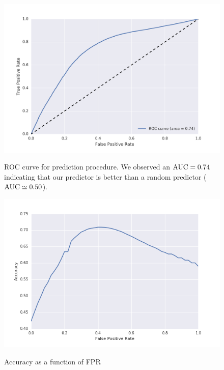 

\begin{figure}[p]
\begin{center}
{\includegraphics[width=0.9\columnwidth,trim={0.5cm 0.5cm 1cm 1cm},clip=true]{figures/ROC_BETA/ROC_Beta_based_approach_201504.png}}
\caption{ROC curve for prediction procedure. We observed an $\operatorname{AUC} = 0.74$ indicating that our predictor is better than a random predictor ($\operatorname{AUC} \simeq 0.50$).}
\label{ROC_multiclass}
\end{center}
\end{figure}


\begin{figure}[p]
\begin{center}
{\includegraphics[width=0.9\columnwidth,trim={0.5cm 0.5cm 1cm 1cm},clip=true]
{figures/accuracy_vs_fpr.png}}
\caption{Accuracy as a function of FPR}
\label{fig:accuracy_vs_fpr}
\end{center}
\end{figure}




